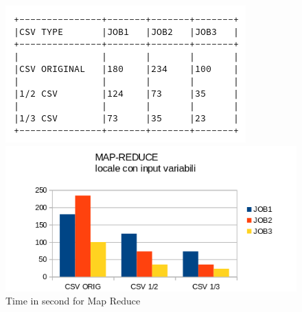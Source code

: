\documentclass[]{report}
\begin{document}
\begin{center}
	\begin{figure}[!htb]
		\begin{minipage}[c]{.40\textwidth}
			\vspace{2 cm}
			\includegraphics[width=1 \linewidth]{figure/maptime}
			\caption{Time in second for Map Reduce}
		\end{minipage}
		\begin{minipage}{.40\textwidth}
						\hspace{0.1 cm}
			\includegraphics[width=2.4 \linewidth]{figure/mapchart}
		\end{minipage}
	\end{figure}
\end{center}	
	
	
\end{document}
